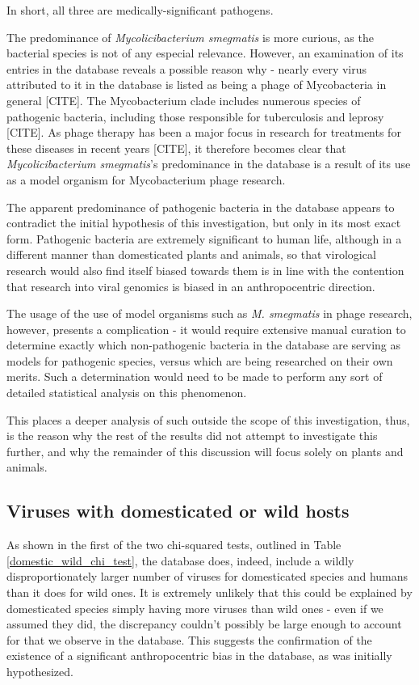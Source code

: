 \documentclass[12pt]{article}
\begin{document}
    In short, all three are medically-significant pathogens.

    The predominance of \emph{Mycolicibacterium smegmatis} is more curious, as the
    bacterial species is not of any especial relevance. However, an examination of 
    its entries in the database reveals a possible reason why - nearly every virus
    attributed to it in the database is listed as being a phage of Mycobacteria in
    general [CITE]. The Mycobacterium clade includes numerous species of pathogenic
    bacteria, including those responsible for tuberculosis and leprosy [CITE]. As 
    phage therapy has been a major focus in research for treatments for these
    diseases in recent years [CITE], it therefore becomes clear that
    \emph{Mycolicibacterium smegmatis}'s predominance in the database is a result
    of its use as a model organism for Mycobacterium phage research.

    The apparent predominance of pathogenic bacteria in the database appears
    to contradict the initial hypothesis of this investigation, but only in its
    most exact form. Pathogenic bacteria are extremely significant to human life,
    although in a different manner than domesticated plants and animals,
    so that virological research would also find itself biased towards them is in
    line with the contention that research into viral genomics is biased in an
    anthropocentric direction.

    The usage of the use of model organisms such as \emph{M. smegmatis} in phage
    research, however, presents a complication - it would require extensive manual
    curation to determine exactly which non-pathogenic bacteria in the database
    are serving as models for pathogenic species, versus which are being researched
    on their own merits. Such a determination would need to be made to perform any
    sort of detailed statistical analysis on this phenomenon.

    This places a deeper analysis of such outside the scope of this investigation,
    thus, is the reason why the rest of the results did not attempt to investigate
    this further, and why the remainder of this discussion will focus solely on
    plants and animals.

    \subsection{Viruses with domesticated or wild hosts}

    As shown in the first of the two chi-squared tests, outlined in Table
    \ref{domestic_wild_chi_test}, the database does, indeed, include a wildly
    disproportionately larger number of viruses for domesticated species and
    humans than it does for wild ones. It is extremely unlikely that this could
    be explained by domesticated species simply having more viruses than wild
    ones - even if we assumed they did, the discrepancy couldn't possibly be
    large enough to account for that we observe in the database. This suggests
    the confirmation of the existence of a significant anthropocentric bias
    in the database, as was initially hypothesized.
\end{document}
